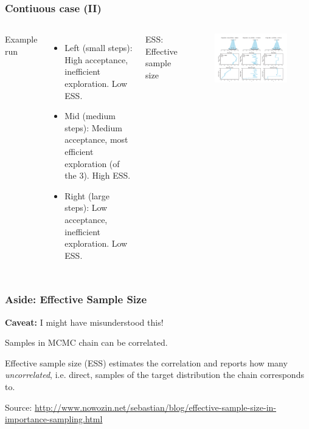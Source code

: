 \documentclass[usenames,dvipsnames,table]{beamer}
\begin{document}
\begin{frame}
\frametitle{Contiuous case (II)}
\begin{columns}[c]
Example run
\begin{itemize}
\item Left (small steps): High acceptance, inefficient exploration. Low ESS.
\item Mid (medium steps): Medium acceptance, most efficient exploration (of the 3). High ESS.
\item Right (large steps): Low acceptance, inefficient exploration. Low ESS.
\end{itemize}
ESS: Effective sample size
\begin{figure}
\centering
\includegraphics[height=0.5\textheight]{img/fig7_4}
\end{figure}
\end{columns}
\end{frame}

\begin{frame}
\frametitle{Aside: Effective Sample Size}

\textbf{Caveat:} I might have misunderstood this!

\vspace{1em}
Samples in MCMC chain can be correlated.

\vspace{1em}
Effective sample size (ESS) estimates the correlation and reports how many \emph{uncorrelated}, i.e. direct, samples of the target distribution the chain corresponds to.

\vspace{1em}
Source:
\url{http://www.nowozin.net/sebastian/blog/effective-sample-size-in-importance-sampling.html}
\end{frame}
\end{document}
